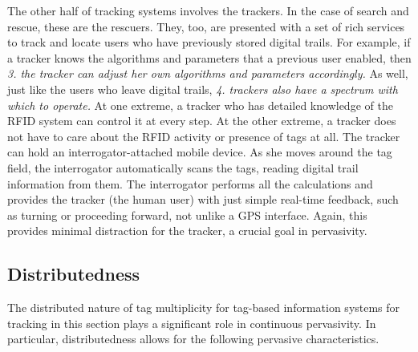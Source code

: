 The other half of tracking systems involves the trackers. In the case of search and rescue, these are the rescuers. They, too, are presented with a set of rich services to track and locate users who have previously stored digital trails. For example, if a tracker knows the algorithms and parameters that a previous user enabled, then \emph{3. the tracker can adjust her own algorithms and parameters accordingly.} As well, just like the users who leave digital trails, \emph{4. trackers also have a spectrum with which to operate.} At one extreme, a tracker who has detailed knowledge of the RFID system can control it at every step. At the other extreme, a tracker does not have to care about the RFID activity or presence of tags at all. The tracker can hold an interrogator-attached mobile device. As she moves around the tag field, the interrogator automatically scans the tags, reading digital trail information from them. The interrogator performs all the calculations and provides the tracker (the human user) with just simple real-time feedback, such as turning or proceeding forward, not unlike a GPS interface. Again, this provides minimal distraction for the tracker, a crucial goal in pervasivity.

\subsection{Distributedness}
The distributed nature of tag multiplicity for tag-based information systems for tracking in this section plays a significant role in continuous pervasivity. In particular, distributedness allows for the following pervasive characteristics.

